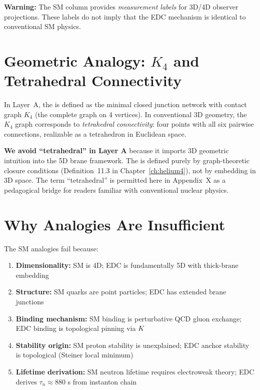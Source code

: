 \textbf{Warning:} The SM column provides \emph{measurement labels} for 3D/4D observer
projections. These labels do not imply that the EDC mechanism is identical to
conventional SM physics.

\section{Geometric Analogy: $K_4$ and Tetrahedral Connectivity}
\label{sec:x:tetrahedral}

In Layer~A, the \ClosedFour{} is defined as the minimal closed junction network
with contact graph $K_4$ (the complete graph on 4 vertices). In conventional
3D geometry, the $K_4$ graph corresponds to \emph{tetrahedral connectivity}:
four points with all six pairwise connections, realizable as a tetrahedron in
Euclidean space.

\textbf{We avoid ``tetrahedral'' in Layer A} because it imports 3D geometric
intuition into the 5D brane framework. The \ClosedFour{} is defined purely by
graph-theoretic closure conditions (Definition~11.3 in Chapter~\ref{ch:helium4}),
not by embedding in 3D space. The term ``tetrahedral'' is permitted here in
Appendix~X as a pedagogical bridge for readers familiar with conventional
nuclear physics.

\section{Why Analogies Are Insufficient}
\label{sec:x:insufficient}

The SM analogies fail because:

\begin{enumerate}
    \item \textbf{Dimensionality:} SM is 4D; EDC is fundamentally 5D with thick-brane embedding
    \item \textbf{Structure:} SM quarks are point particles; EDC has extended brane junctions
    \item \textbf{Binding mechanism:} SM binding is perturbative QCD gluon exchange;
        EDC binding is topological pinning via $K$
    \item \textbf{Stability origin:} SM proton stability is unexplained; EDC anchor stability
        is topological (Steiner local minimum)
    \item \textbf{Lifetime derivation:} SM neutron lifetime requires electroweak theory;
        EDC derives $\tau_n \approx 880$ s from instanton chain
\end{enumerate}


